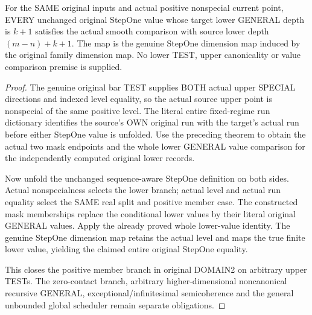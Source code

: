 \begin{theorem}
\label{hir:original-domain-two-positive-step-one-any-test-smooth-values}
\leanok
For the SAME original inputs and actual positive nonspecial current
point, EVERY unchanged original StepOne value whose target lower
GENERAL depth is $k+1$ satisfies the actual smooth comparison with
source lower depth $(m-n)+k+1$. The map is the genuine StepOne
dimension map induced by the original family dimension map. No lower
TEST, upper canonicality or value comparison premise is supplied.
\end{theorem}
\begin{proof}
The genuine original bar TEST supplies BOTH actual upper SPECIAL
directions and indexed level equality, so the actual source upper
point is nonspecial of the same positive level. The literal entire
fixed-regime run dictionary identifies the source's OWN original run
with the target's actual run before either StepOne value is unfolded.
Use the preceding theorem to obtain the actual two mask endpoints and
the whole lower GENERAL value comparison for the independently
computed original lower records.

Now unfold the unchanged sequence-aware StepOne definition on both
sides. Actual nonspecialness selects the lower branch; actual level
and actual run equality select the SAME real split and positive member
case. The constructed mask memberships replace the conditional lower
values by their literal original GENERAL values. Apply the already
proved whole lower-value identity. The genuine StepOne dimension map
retains the actual level and maps the true finite lower value, yielding
the claimed entire original StepOne equality.

This closes the positive member branch in original DOMAIN2 on arbitrary
upper TESTs. The zero-contact branch, arbitrary higher-dimensional
noncanonical recursive GENERAL, exceptional/infinitesimal semicoherence
and the general unbounded global scheduler remain separate obligations.
\end{proof}
